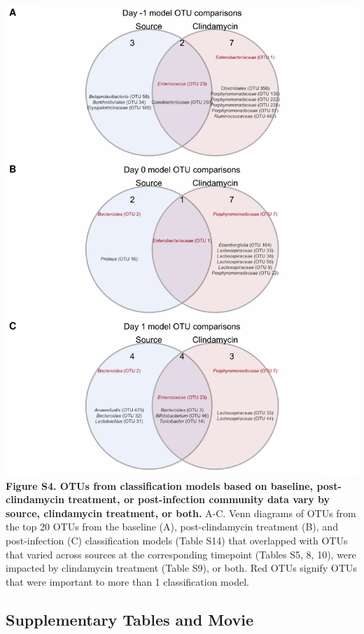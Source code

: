 \documentclass[
  11pt,
]{article}
\begin{document}
\includegraphics{figure_S4.pdf} \textbf{Figure S4. OTUs from
classification models based on baseline, post-clindamycin treatment, or
post-infection community data vary by source, clindamycin treatment, or
both.} A-C. Venn diagrams of OTUs from the top 20 OTUs from the baseline
(A), post-clindamycin treatment (B), and post-infection (C)
classification models (Table S14) that overlapped with OTUs that varied
across sources at the corresponding timepoint (Tables S5, 8, 10), were
impacted by clindamycin treatment (Table S9), or both. Red OTUs signify
OTUs that were important to more than 1 classification model.

\newpage

\hypertarget{supplementary-tables-and-movie}{%
\subsection{Supplementary Tables and
Movie}\label{supplementary-tables-and-movie}}
\end{document}
